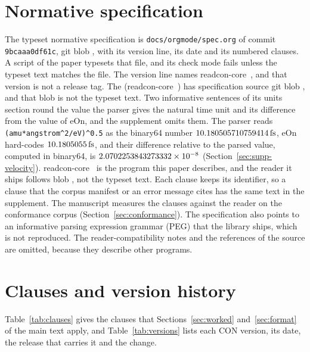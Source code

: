 \documentclass[preprint,12pt]{elsarticle}
\begin{document}
\section{Normative specification}\label{sec:spec-normative} The typeset normative specification is \texttt{docs/orgmode/spec.org} of commit \texttt{9bcaaa0df61c}, git blob \texttt{\specTextBlob}, with its version line, its date and its \specClauses{} numbered clauses.
A script of the paper typesets that file, and its check mode fails unless the typeset text matches the file.
The version line names readcon-core~\specTextRelease{}, and that version is not a release tag.
The \readconcommitrole{} \texttt{\readconcommitshort} (readcon-core~\rcMeasuredVersion{}) has specification source git blob \texttt{\rcMeasuredSpecBlob}, and that blob is not the typeset text.
Two informative sentences of its units section round the value the parser gives the natural time unit and its difference from the value of eOn, and the supplement omits them.
The parser reads \texttt{(amu*angstrom\^{}2/eV)\^{}0.5} as the binary64 number \(10.180505710759414\,\mathrm{fs}\), eOn hard-codes \(10.1805055\,\mathrm{fs}\), and their difference relative to the parsed value, computed in binary64, is \(2.0702253843273332\times10^{-8}\) (Section~\ref{sec:supp-velocity}).
readcon-core~\readconCargoVersion{} is the program this paper describes, and the reader it ships follows blob \texttt{\rcMeasuredSpecBlob}, not the typeset text.
Each clause keeps its identifier, so a clause that the corpus manifest or an error message cites has the same text in the supplement.
The manuscript measures the clauses against the reader on the conformance corpus (Section~\ref{sec:conformance}).
The specification also points to an informative parsing expression grammar (PEG) that the library ships, which is not reproduced.
The reader-compatibility notes and the references of the source are omitted, because they describe other programs.



  

\FloatBarrier \section{Clauses and version history}\label{sec:supp-clauses} Table~\ref{tab:clauses} gives the clauses that Sections~\ref{sec:worked} and~\ref{sec:format} of the main text apply, and Table~\ref{tab:versions} lists each CON version, its date, the release that carries it and the change.
\end{document}
